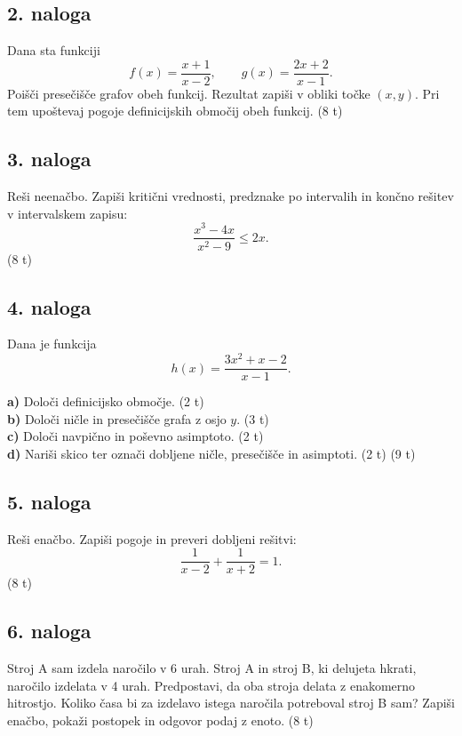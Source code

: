 \documentclass[11pt]{article}
\begin{document}
\vfill
\newpage

\subsection*{2. naloga}

Dana sta funkciji
\[
 f(x)=\frac{x+1}{x-2},\qquad g(x)=\frac{2x+2}{x-1}.
\]
Poišči presečišče grafov obeh funkcij. Rezultat zapiši v obliki točke $(x,y)$. Pri tem upoštevaj pogoje definicijskih območij obeh funkcij. \hfill (8 t)

\vspace{7cm}

\subsection*{3. naloga} 

Reši neenačbo. Zapiši kritični vrednosti, predznake po intervalih in končno rešitev v intervalskem zapisu:
\[
 \frac{x^3-4x}{x^2-9}\le 2x.
\] \hfill (8 t)

\newpage

\subsection*{4. naloga}

Dana je funkcija
\[
 h(x)=\frac{3x^2+x-2}{x-1}.
\]

\noindent\textbf{a)} Določi definicijsko območje. (2 t) \\
\noindent\textbf{b)} Določi ničle in presečišče grafa z osjo $y$. (3 t) \\
\noindent\textbf{c)} Določi navpično in poševno asimptoto. (2 t) \\
\noindent\textbf{d)} Nariši skico ter označi dobljene ničle, presečišče in asimptoti. (2 t) \hfill (9 t)

\vfill
\newpage

\subsection*{5. naloga}

Reši enačbo. Zapiši pogoje in preveri dobljeni rešitvi:
\[
 \frac{1}{x-2}+\frac{1}{x+2}=1.
\] \hfill (8 t)

\vspace{7cm}

\subsection*{6. naloga}

Stroj A sam izdela naročilo v 6 urah. Stroj A in stroj B, ki delujeta hkrati, naročilo izdelata v 4 urah. Predpostavi, da oba stroja delata z enakomerno hitrostjo. Koliko časa bi za izdelavo istega naročila potreboval stroj B sam? Zapiši enačbo, pokaži postopek in odgovor podaj z enoto. \hfill (8 t)
\end{document}

